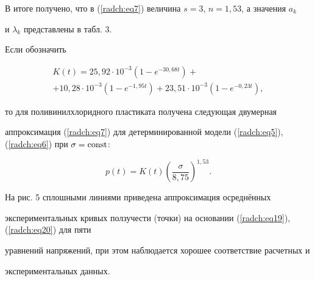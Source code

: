 В итоге получено, что в (\ref{radch:eq7}) величина $s = 3$, $n = 1,53$, а значения $a_k $ 

и $\lambda _k $ представлены в табл. 3.





Если обозначить



\vspace{-5mm}



\begin{multline}

\label{radch:eq19}

K\left( t \right) = 25,92 \cdot 10^{ - 3}\left( {1 - e^{ - 30,68t}} \right) 

+ \\+ 10,28 \cdot 10^{ - 3}\left( {1 - e^{ - 1,95t}} \right) + 23,51 \cdot 10^{ 

- 3}\left( {1 - e^{ - 0,23t}} \right),

\end{multline}



\vspace{-3mm}



\noindent

то для поливинилхлоридного пластиката получена следующая двумерная 

аппроксимация (\ref{radch:eq7}) для детерминированной модели (\ref{radch:eq5}), (\ref{radch:eq6}) при $\sigma = \rm  

const$:

\begin{equation}

\label{radch:eq20}

p\left( t \right) = K\left( t \right)\left( {\frac{\sigma }{8,75}} 

\right)^{1,53}.

\end{equation}



На рис. 5 сплошными линиями приведена аппроксимация осреднённых 

экспериментальных кривых ползучести (точки) на основании (\ref{radch:eq19}), (\ref{radch:eq20}) для пяти 

уравнений напряжений, при этом наблюдается хорошее соответствие расчетных и 

экспериментальных данных.



